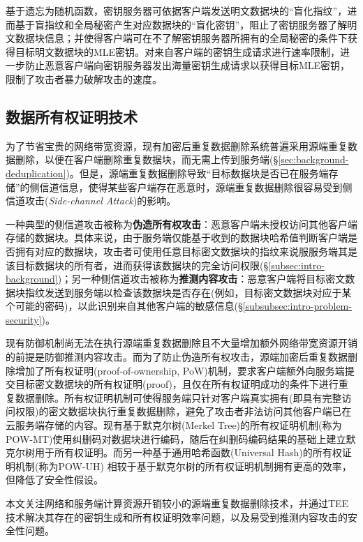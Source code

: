 基于遗忘为随机函数，密钥服务器可依据客户端发送明文数据块的“盲化指纹”，进而基于盲指纹和全局秘密产生对应数据块的“盲化密钥”，阻止了密钥服务器了解明文数据块信息；并使得客户端可在不了解密钥服务器所拥有的全局秘密的条件下获得目标明文数据块的MLE密钥。对来自客户端的密钥生成请求进行速率限制，进一步防止恶意客户端向密钥服务器发出海量密钥生成请求以获得目标MLE密钥，限制了攻击者暴力破解攻击的速度。

\subsection{数据所有权证明技术}
\label{subsec:background-encrypted-deduplication-pow}

为了节省宝贵的网络带宽资源，现有加密后重复数据删除系统普遍采用源端重复数据删除，以便在客户端删除重复数据块，而无需上传到服务端(\S\ref{sec:background-deduplication})。但是，源端重复数据删除导致“目标数据块是否已在服务端存储”的侧信道信息，使得某些客户端存在恶意时，源端重复数据删除很容易受到侧信道攻击(\textit{Side-channel Attack})\cite{harnik2010side,halevi11}的影响。

一种典型的侧信道攻击被称为\textbf{伪造所有权攻击}：恶意客户端未授权访问其他客户端存储的数据块\cite{harnik2010side,mulazzani11}。具体来说，由于服务端仅能基于收到的数据块哈希值判断客户端是否拥有对应的数据块，攻击者可使用任意目标密文数据块的指纹来说服服务端其是该目标数据块的所有者，进而获得该数据块的完全访问权限(\S\ref{subsec:intro-background})；另一种侧信道攻击被称为\textbf{推测内容攻击}：恶意客户端将目标密文数据块指纹发送到服务端以检查该数据块是否存在(例如，目标密文数据块对应于某个可能的密码\cite{harnik2010side})，以此识别来自其他客户端的敏感信息(\S\ref{subsubsec:intro-problem-security})。

现有防御机制尚无法在执行源端重复数据删除且不大量增加额外网络带宽资源开销的前提是防御推测内容攻击。而为了防止伪造所有权攻击，源端加密后重复数据删除增加了所有权证明(proof-of-ownership, PoW)机制\cite{halevi11}，要求客户端额外向服务端提交目标密文数据块的所有权证明(proof)，且仅在所有权证明成功的条件下进行重复数据删除。所有权证明机制可使得服务端只针对客户端真实拥有(即具有完整访问权限)的密文数据块执行重复数据删除，避免了攻击者非法访问其他客户端已在云服务端存储的内容。现有基于默克尔树(Merkel Tree)的所有权证明机制(称为POW-MT)\cite{xu2013weak}使用纠删码对数据块进行编码，随后在纠删码编码结果的基础上建立默克尔树用于所有权证明。而另一种基于通用哈希函数(Universal Hash)的所有权证明机制(称为POW-UH)\cite{halevi2011proofs} 相较于基于默克尔树的所有权证明机制拥有更高的效率，但降低了安全性假设。

本文关注网络和服务端计算资源开销较小的源端重复数据删除技术，并通过TEE技术解决其存在的密钥生成和所有权证明效率问题，以及易受到推测内容攻击的安全性问题。

